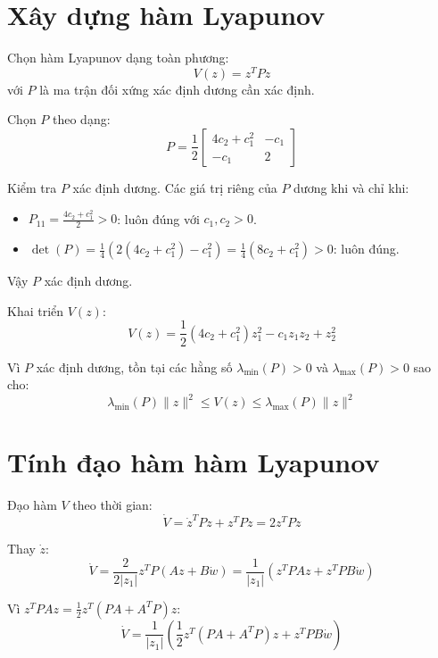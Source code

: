 \documentclass[12pt,a4paper]{report}
\begin{document}
\section{Xây dựng hàm Lyapunov}
Chọn hàm Lyapunov dạng toàn phương:
\begin{equation}
V(z) = z^T P z
\end{equation}
với $P$ là ma trận đối xứng xác định dương cần xác định.

Chọn $P$ theo dạng:
\begin{equation}
P = \frac{1}{2} \begin{bmatrix} 4c_2 + c_1^2 & -c_1 \\ -c_1 & 2 \end{bmatrix}
\end{equation}

Kiểm tra $P$ xác định dương. Các giá trị riêng của $P$ dương khi và chỉ khi:
\begin{itemize}
\item $P_{11} = \frac{4c_2 + c_1^2}{2} > 0$: luôn đúng với $c_1, c_2 > 0$.
\item $\det(P) = \frac{1}{4}(2(4c_2 + c_1^2) - c_1^2) = \frac{1}{4}(8c_2 + c_1^2) > 0$: luôn đúng.
\end{itemize}
Vậy $P$ xác định dương.

Khai triển $V(z)$:
\begin{equation}
V(z) = \frac{1}{2}(4c_2 + c_1^2) z_1^2 - c_1 z_1 z_2 + z_2^2
\end{equation}

Vì $P$ xác định dương, tồn tại các hằng số $\lambda_{\min}(P) > 0$ và $\lambda_{\max}(P) > 0$ sao cho:
\begin{equation}
\lambda_{\min}(P) \|z\|^2 \le V(z) \le \lambda_{\max}(P) \|z\|^2
\end{equation}

\section{Tính đạo hàm hàm Lyapunov}
Đạo hàm $V$ theo thời gian:
\begin{equation}
\dot{V} = \dot{z}^T P z + z^T P \dot{z} = 2 z^T P \dot{z}
\end{equation}

Thay $\dot{z}$:
\begin{equation}
\dot{V} = \frac{2}{2|z_1|} z^T P (Az + B\dot{w}) = \frac{1}{|z_1|} \left( z^T P A z + z^T P B \dot{w} \right)
\end{equation}

Vì $z^T P A z = \frac{1}{2} z^T (PA + A^T P) z$:
\begin{equation}
\dot{V} = \frac{1}{|z_1|} \left( \frac{1}{2} z^T (PA + A^T P) z + z^T P B \dot{w} \right)
\end{equation}
\end{document}
